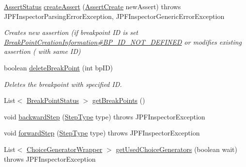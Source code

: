 \begin{DoxyCompactItemize}
\hyperlink{interfacegov_1_1nasa_1_1jpf_1_1inspector_1_1interfaces_1_1_assert_status}{Assert\+Status} \hyperlink{classgov_1_1nasa_1_1jpf_1_1inspector_1_1server_1_1jpf_1_1_j_p_f_inspector_parallel_a43b16f4b3ec72aa49bde661e3dcaa411}{create\+Assert} (\hyperlink{interfacegov_1_1nasa_1_1jpf_1_1inspector_1_1interfaces_1_1_assert_create}{Assert\+Create} new\+Assert)  throws J\+P\+F\+Inspector\+Parsing\+Error\+Exception, J\+P\+F\+Inspector\+Generic\+Error\+Exception 
\begin{DoxyCompactList}\small\item\em Creates new assertion (if breakpoint ID is set \hyperlink{interfacegov_1_1nasa_1_1jpf_1_1inspector_1_1interfaces_1_1_break_point_creation_information_a24626231e3744e59f505d0731d4ca9e1}{Break\+Point\+Creation\+Information\#\+B\+P\+\_\+\+I\+D\+\_\+\+N\+O\+T\+\_\+\+D\+E\+F\+I\+N\+ED} or modifies existing assertion ( with same ID) \end{DoxyCompactList}\item 
boolean \hyperlink{classgov_1_1nasa_1_1jpf_1_1inspector_1_1server_1_1jpf_1_1_j_p_f_inspector_parallel_a2ba1c1cc1dbfe753bdaf436df0f27b45}{delete\+Break\+Point} (int bp\+ID)
\begin{DoxyCompactList}\small\item\em Deletes the breakpoint with specified ID. \end{DoxyCompactList}\item 
List$<$ \hyperlink{interfacegov_1_1nasa_1_1jpf_1_1inspector_1_1interfaces_1_1_break_point_status}{Break\+Point\+Status} $>$ \hyperlink{classgov_1_1nasa_1_1jpf_1_1inspector_1_1server_1_1jpf_1_1_j_p_f_inspector_parallel_aece93f3c2d838eab005a433464057e8e}{get\+Break\+Points} ()
\item 
void \hyperlink{classgov_1_1nasa_1_1jpf_1_1inspector_1_1server_1_1jpf_1_1_j_p_f_inspector_parallel_a21d3717ef52ff7e0c22c555e854329fb}{backward\+Step} (\hyperlink{enumgov_1_1nasa_1_1jpf_1_1inspector_1_1interfaces_1_1_commands_interface_1_1_step_type}{Step\+Type} type)  throws J\+P\+F\+Inspector\+Exception 
\item 
void \hyperlink{classgov_1_1nasa_1_1jpf_1_1inspector_1_1server_1_1jpf_1_1_j_p_f_inspector_parallel_a182ea15bc6fb1c943bbb5b0e6bed9723}{forward\+Step} (\hyperlink{enumgov_1_1nasa_1_1jpf_1_1inspector_1_1interfaces_1_1_commands_interface_1_1_step_type}{Step\+Type} type)  throws J\+P\+F\+Inspector\+Exception 
\item 
List$<$ \hyperlink{classgov_1_1nasa_1_1jpf_1_1inspector_1_1utils_1_1_choice_generator_wrapper}{Choice\+Generator\+Wrapper} $>$ \hyperlink{classgov_1_1nasa_1_1jpf_1_1inspector_1_1server_1_1jpf_1_1_j_p_f_inspector_parallel_ac94b376a4fb74396e6f52a29ab659d84}{get\+Used\+Choice\+Generators} (boolean wait)  throws J\+P\+F\+Inspector\+Exception 

\end{DoxyCompactItemize}
